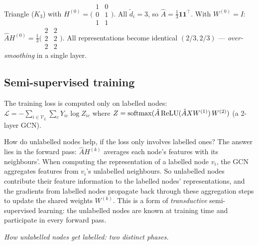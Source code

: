 \begin{notechapter}
\begin{example}
Triangle ($K_3$) with $H^{(0)} = \bigl(\begin{smallmatrix}1&0\\0&1\\1&1
\end{smallmatrix}\bigr)$. All $\tilde{d}_i = 3$, so $\hat{A} = \frac{1}{3}
\mathbf{1}\mathbf{1}^\top$. With $W^{(0)}=I$:
$\hat{A}H^{(0)} = \frac{1}{3}\bigl(\begin{smallmatrix}2&2\\2&2\\2&2
\end{smallmatrix}\bigr)$. All representations become identical
$(2/3,2/3)$ --- \emph{over-smoothing} in a single layer.
\end{example}

\subsection{Semi-supervised training}

The training loss is computed only on labelled nodes:
$\mathcal{L} = -\sum_{i \in \mathcal{V}_L}\sum_c Y_{ic}\log Z_{ic}$
where $Z = \operatorname{softmax}(\hat{A}\,\mathrm{ReLU}(\hat{A}XW^{(1)})\,W^{(2)})$
(a 2-layer GCN).

How do unlabelled nodes help, if the loss only involves labelled ones? The
answer lies in the forward pass: $\hat{A}H^{(k)}$ averages each node's features
with its neighbours'. When computing the representation of a labelled node $v_i$,
the GCN aggregates features from $v_i$'s unlabelled neighbours. So unlabelled
nodes contribute their feature information to the labelled nodes' representations,
and the gradients from labelled nodes propagate back through these aggregation
steps to update the shared weights $W^{(k)}$. This is a form of
\emph{transductive} semi-supervised learning: the unlabelled nodes are known at
training time and participate in every forward pass.

\begin{keyidea}
\emph{How unlabelled nodes get labelled: two distinct phases.}


\end{keyidea}
\end{notechapter}

